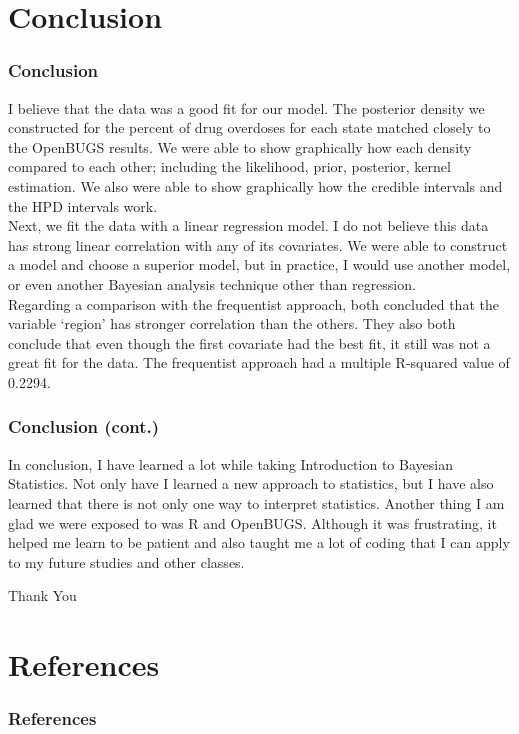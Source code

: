 \documentclass[10pt]{beamer}
\begin{document}
\section{Conclusion}
\begin{frame}
\frametitle{Conclusion}
	{\footnotesize I believe that the data was a good fit for our model. The posterior density we constructed for the percent of drug overdoses for each state matched closely to the OpenBUGS results. We were able to show graphically how each density compared to each other; including the likelihood, prior, posterior, kernel estimation. We also were able to show graphically how the credible intervals and the HPD intervals work.\\[2mm]
	Next, we fit the data with a linear regression model. I do not believe this data has strong linear correlation with any of its covariates. We were able to construct a model and choose a superior model, but in practice, I would use another model, or even another Bayesian analysis technique other than regression.\\[2mm]
	Regarding a comparison with the frequentist approach, both concluded that the variable `region' has stronger correlation than the others. They also both conclude that even though the first covariate had the best fit, it still was not a great fit for the data. The frequentist approach had a multiple R-squared value of 0.2294.}
\end{frame}

\begin{frame}
\frametitle{Conclusion (cont.)}
	In conclusion, I have learned a lot while taking Introduction to Bayesian Statistics. Not only have I learned a new approach to statistics, but I have also learned that there is not only one way to interpret statistics. Another thing I am glad we were exposed to was R and OpenBUGS. Although it was frustrating, it helped me learn to be patient and also taught me a lot of coding that I can apply to my future studies and other classes.\\[5mm]
	\begin{center}
	Thank You
	\end{center}
\end{frame}

\section{References}
\begin{frame}[allowframebreaks]
\frametitle{References}
	

\end{frame}
\end{document}
